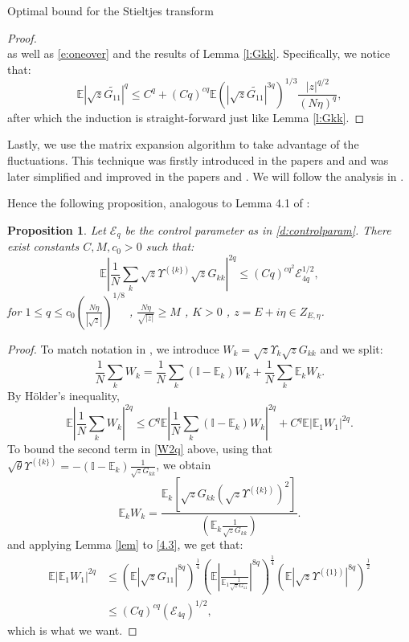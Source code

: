 \documentclass[11pt, a4paper, oneside]{book}
\numberwithin{equation}{chapter}
\newcommand{\E}{\mathbb E}
\newcommand{\beq}{\begin{equation}}
\newcommand{\eeq}{\end{equation}}
\newtheorem{prop}[thm]{Proposition}
\begin{document}
\begin{section}{Optimal bound for the Stieltjes transform}
\begin{proof}
\begin{equation}
\end{equation}
%
as well as \eqref{e:oneover} and the results of Lemma \ref{l:Gkk}. Specifically, we notice that:
\[
\E |\sqrt{z} \widetilde{G_{11}}|^q \leq C^q + (Cq)^{cq} \E \left ( |\sqrt{z} \widetilde{G_{11}}|^{3q} \right )^{1/3} \frac{|z|^{q/2}}{(N\eta)^q} ,
\]
after which the induction is straight-forward just like Lemma \ref{l:Gkk}.
\end{proof}
%
Lastly, we use the matrix expansion algorithm to take advantage of the fluctuations. This technique was firstly introduced in the papers \cite{erdos2010universality} and \cite{erdHos2012rigidity} and was later simplified and improved in the papers \cite{erdHos2013averaging} and \cite{erdHos2013local}. We will follow the analysis in \cite{cacciapuoti2015bounds}.

Hence the following proposition, analogous to Lemma 4.1 of \cite{cacciapuoti2015bounds}:
\begin{prop} \label{p:optimalbound}
 Let $\mathcal{E}_q$ be the control parameter as in \eqref{d:controlparam}. There exist constants $C, M, c_0 >0$ such that:
%
\begin{equation} \label{4.2}
\E \left | \frac{1}{N} \sum \limits_k \sqrt{z} \Upsilon^{(\{k\})}  \sqrt{z} G_{kk} \right |^{2q} \leq (Cq)^{cq^2} \mathcal{E}_{4q}^{1/2} ,
\end{equation}
%
for $1 \leq q \leq c_0 \left (\frac{N\eta}{|\sqrt{z}|} \right )^{1/8} $ , $\frac{N\eta}{\sqrt{|z|}}\geq M $ , $K>0$ , $z = E + i \eta \in Z_{E, \eta} $.
\end{prop}
%
\begin{proof}
%
To match notation in \cite{cacciapuoti2015bounds}, we introduce $W_k= \sqrt{z} \Upsilon_{k} \sqrt{z} G_{kk}$ and we split:
%
\beq
\label{e:eW2q} \frac{1}{N} \sum \limits_k  W_k = \frac{1}{N} \sum \limits_k (\mathbb{I}-\E_k)W_k + \frac{1}{N}\sum \limits_k \E_k W_k . \eeq
By H\"older's inequality,
\beq \label{W2q} \E \left | \frac{1}{N} \sum \limits_k  W_k \right |^{2q} \leq C^q \E \left | \frac{1}{N} \sum \limits_k  ( \mathbb{I} - \E_k) W_k \right |^{2q} + C^q \E |\E_1 W_1|^{2q} .
\eeq
%
To bound the second term in \eqref{W2q} above, using that $\sqrt{\theta}\Upsilon^{(\{k\})}=-(\mathbb{I}-\E_k)\frac{1}{\sqrt{z}G_{kk}}$, we obtain
%
\begin{equation} \label{4.3}
\E_k W_k = \frac{\E_k [\sqrt{z} G_{kk} (\sqrt{z}\Upsilon^{(\{k\})})^2]}{\left (\E_k\frac{1}{\sqrt{z} G_{kk}}\right )}.
\end{equation}
%
and applying Lemma \ref{lem} to \eqref{4.3}, we get that:
\begin{align*}
\E | \E_1 W_1 |^{2q} &\leq (\E |\sqrt{z} G_{11}|^{8q})^{\frac{1}{4}} \left ( \E \left | \frac{1}{\E_1 \frac{1}{\sqrt{z} G_{11}}} \right |^{8q} \right )^{\frac{1}{4}} ( \E | \sqrt{z} \Upsilon^{(\{1\})} |^{8q} )^{\frac{1}{2}} \\
&\leq (Cq)^{cq} \left ( \mathcal{E}_{4q} \right )^{1/2} ,
\end{align*}
which is what we want.


\end{proof}
\end{section}
\end{document}
